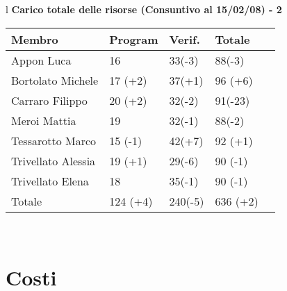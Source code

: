 \begin{table}[hbtp]
\large{
\begin{tabular}{l}
\Large{\textbf{\textsf{Carico totale delle risorse (Consuntivo al 15/02/08) - 2}}} \\

\begin{tabular}{||p{3.5cm}||p{2cm}||p{2cm}||p{2cm}||p{2cm}||}
\hline
\textbf{Membro} & \textbf{Program} & \textbf{Verif.} & \textbf{Totale}\\
\hline
{Appon Luca}&16&33\footnotesize{(-3)}&88\footnotesize{(-3)} \\ 
\hline 
{Bortolato Michele} &17 \footnotesize{(+2)}&37\footnotesize{(+1)}&96 \footnotesize{(+6)}\\ 
\hline
{Carraro Filippo}&20 \footnotesize{(+2)}&32\footnotesize{(-2)}&91\footnotesize{(-23)} \\
\hline
{Meroi Mattia}&19&32\footnotesize{(-1)}&88\footnotesize{(-2)}\\
\hline
{Tessarotto Marco} &15 \footnotesize{(-1)}&42\footnotesize{(+7)}&92 \footnotesize{(+1)}\\
\hline
{Trivellato Alessia} &19 \footnotesize{(+1)}&29\footnotesize{(-6)}&90 \footnotesize{(-1)} \\
\hline
{Trivellato Elena} &18&35\footnotesize{(-1)}&90 \footnotesize{(-1)} \\
\hline
{Totale} &124 \footnotesize{(+4)}&240\footnotesize{(-5)}&636 \footnotesize{(+2)} \\
\hline

\end{tabular} \\
\end{tabular}
}
\end{table}


\chapter{Costi}
